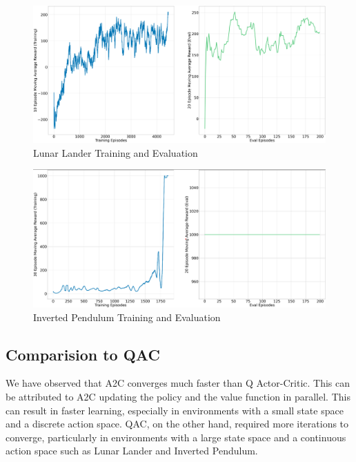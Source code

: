 \documentclass{article} %
\begin{document}
\begin{figure}[H]
    \begin{center}
        \includegraphics[width=\textwidth]{a2c_lunar.png}
    \end{center}
    \caption{Lunar Lander Training and Evaluation}
\end{figure}

\begin{figure}[H]
    \begin{center}
        \includegraphics[width=\textwidth]{a2c_invpendulum.png}
    \end{center}
    \caption{Inverted Pendulum Training and Evaluation}
\end{figure}

\subsection{Comparision to QAC}
We have observed that A2C converges much faster than Q Actor-Critic. This can be attributed to A2C updating the policy and the value function in parallel. This can result in faster learning, especially in environments with a small state space and a discrete action space. QAC, on the other hand, required more iterations to converge, particularly in environments with a large state space and a continuous action space such as Lunar Lander and Inverted Pendulum.
\end{document}
